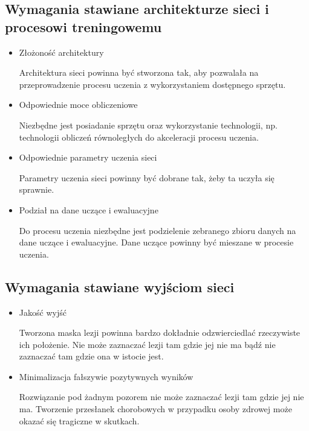 \subsection{Wymagania stawiane architekturze sieci i procesowi treningowemu}
\label{sec:NetworkRequirements}
\begin{itemize}
    \item 
    Złożoność architektury
    \par
    Architektura sieci powinna być stworzona tak, aby pozwalała na przeprowadzenie procesu uczenia z wykorzystaniem dostępnego sprzętu.
    \item 
    Odpowiednie moce obliczeniowe
    \par
    Niezbędne jest posiadanie sprzętu oraz wykorzystanie technologii, np. technologii obliczeń równoległych do akceleracji procesu uczenia.
    \item 
    Odpowiednie parametry uczenia sieci
    \par
    Parametry uczenia sieci powinny być dobrane tak, żeby ta uczyła się sprawnie.
    \item 
    Podział na dane uczące i ewaluacyjne
    \par
    Do procesu uczenia niezbędne jest podzielenie zebranego zbioru danych na dane uczące i ewaluacyjne. Dane uczące powinny być mieszane w procesie uczenia.
\end{itemize}

\subsection{Wymagania stawiane wyjściom sieci}
\label{sec:OutputRequirements}
\begin{itemize}
    \item 
    Jakość wyjść
    \par
    Tworzona maska lezji powinna bardzo dokładnie odzwierciedlać rzeczywiste ich położenie. Nie może zaznaczać lezji tam gdzie jej nie ma bądź nie zaznaczać tam gdzie ona w istocie jest.
    \item 
    Minimalizacja fałszywie pozytywnych wyników
    \par
    Rozwiązanie pod żadnym pozorem nie może zaznaczać lezji tam gdzie jej nie ma. Tworzenie przesłanek chorobowych w przypadku osoby zdrowej może okazać się tragiczne w skutkach.
\end{itemize}
